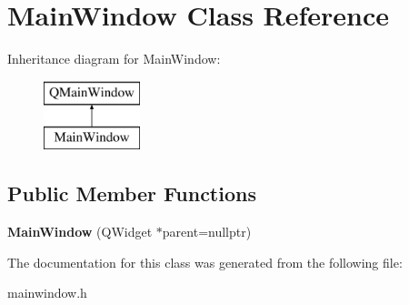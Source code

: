 \hypertarget{class_main_window}{}\section{Main\+Window Class Reference}
\label{class_main_window}
Inheritance diagram for Main\+Window\+:\begin{figure}[H]
\begin{center}
\leavevmode
\includegraphics[height=2.000000cm]{class_main_window}
\end{center}
\end{figure}
\subsection*{Public Member Functions}
\begin{DoxyCompactItemize}
\item 
\mbox{\label{class_main_window_a996c5a2b6f77944776856f08ec30858d}} 
{\bfseries Main\+Window} (Q\+Widget $\ast$parent=nullptr)
\end{DoxyCompactItemize}


The documentation for this class was generated from the following file\+:\begin{DoxyCompactItemize}
\item 
mainwindow.\+h\end{DoxyCompactItemize}
